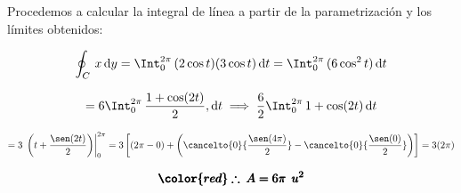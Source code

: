 \documentclass[12pt]{article}
\begin{document}
\noindent Procedemos a calcular la integral de línea a partir de la parametrización y los límites obtenidos:

\begin{align*}
	\oint_C\, x\,\mathrm{d}y = \Int_{0}^{2\pi}\, (2\cos t)(3\cos t)\,\mathrm{d}t = \Int_{0}^{2\pi}\, (6\cos^2 t)\,\mathrm{d}t
\end{align*}

\begin{align*}
	= 6\Int_{0}^{2\pi}\, \frac{1+\cos(2t)}{2},\mathrm{d}t
	\implies \frac{6}{2}\Int_{0}^{2\pi}\, 1+\cos(2t)\,\mathrm{d}t
\end{align*}

\begin{align*}
	= 3\,\left.\left(t + \frac{\sen(2t)}{2}\right)\right|_{0}^{2\pi} = 3\left[ \left(2\pi - 0\right) + \left( \cancelto{0}{\frac{\sen(4\pi)}{2}} - \cancelto{0}{\frac{\sen(0)}{2}} \right) \right] = 3(2\pi)
\end{align*}

\begin{align*}
	\pmb{\color{red} \therefore\: A = 6\pi\: \: u^2}
\end{align*}
\end{document}
